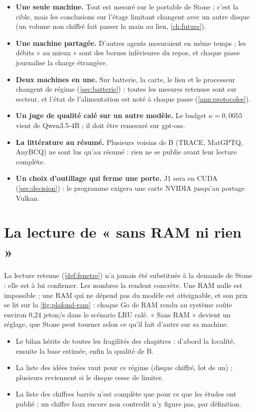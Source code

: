 \begin{itemize}
\item \textbf{Une seule machine.} Tout est mesuré sur le portable de Stone ; c'est la cible, mais les conclusions sur l'étage limitant changent avec un autre disque (un volume non chiffré fait passer la main au lien, \cref{ch:futurs}).
\item \textbf{Une machine partagée.} D'autres agents mesuraient en même temps ; les débits « au mieux » sont des bornes inférieures du repos, et chaque passe journalise la charge étrangère.
\item \textbf{Deux machines en une.} Sur batterie, la carte, le lien et le processeur changent de régime (\cref{sec:batterie}) ; toutes les mesures retenues sont sur secteur, et l'état de l'alimentation est noté à chaque passe (\cref{ann:protocoles}).
\item \textbf{Un juge de qualité calé sur un autre modèle.} Le budget $\kappa = 0{,}0055$ vient de Qwen3.5-4B ; il doit être remesuré sur gpt-oss.
\item \textbf{La littérature au résumé.} Plusieurs voisins de B (TRACE, MatGPTQ, AnyBCQ) ne sont lus qu'au résumé : rien ne se publie avant leur lecture complète.
\item \textbf{Un choix d'outillage qui ferme une porte.} J1 sera en CUDA (\cref{sec:decision}) : le programme exigera une carte NVIDIA jusqu'au portage Vulkan.
\end{itemize}

\section{La lecture de « sans RAM ni rien »}\label{sec:lecture-discussion}

La lecture retenue (\cref{def:fenetre}) n'a jamais été substituée à la demande de Stone : elle est à lui confirmer. Les nombres la rendent concrète. Une RAM nulle est impossible ; une RAM qui ne dépend pas du modèle est atteignable, et son prix se lit sur la \cref{fig:plafond-ram} : chaque Go de RAM rendu au système coûte environ 0,24 jeton/s dans le scénario LRU calé. « Sans RAM » devient un réglage, que Stone peut tourner selon ce qu'il fait d'autre sur sa machine.

\begin{faux}
\begin{itemize}
\item Le bilan hérite de toutes les fragilités des chapitres : d'abord la localité, ensuite la base estimée, enfin la qualité de B.
\item La liste des idées tuées vaut pour ce régime (disque chiffré, lot de un) ; plusieurs reviennent si le disque cesse de limiter.
\item La liste des chiffres barrés n'est complète que pour ce que les études ont publié ; un chiffre faux encore non contredit n'y figure pas, par définition.
\end{itemize}
\end{faux}
